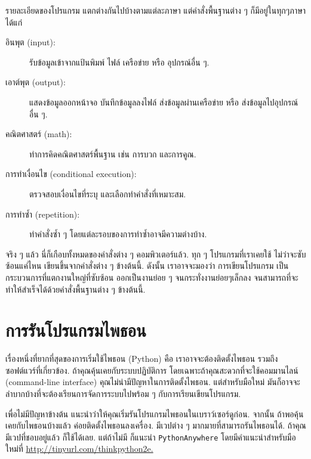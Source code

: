 รายละเอียดของโปรแกรม แตกต่างกันไปบ้างตามแต่ละภาษา แต่คำสั่งพื้นฐานต่าง ๆ ก็มีอยู่ในทุกๆภาษา ได้แก่

\begin{description}

\item[อินพุต (input):] รับข้อมูลเข้าจากแป้นพิมพ์ ไฟล์ เครือข่าย หรือ อุปกรณ์อื่น ๆ.

\item[เอาต์พุต (output):] แสดงข้อมูลออกหน้าจอ บันทึกข้อมูลลงไฟล์ ส่งข้อมูลผ่านเครือข่าย หรือ ส่งข้อมูลไปอุปกรณ์อื่น ๆ.
    
\item[คณิตศาสตร์ (math):] ทำการคิดคณิตศาสตร์พื้นฐาน เช่น การบวก และการคูณ.
    
\item[การทำเงื่อนไข (conditional execution):] ตรวจสอบเงื่อนไขที่ระบุ และเลือกทำคำสั่งที่เหมาะสม.
    
\item[การทำซ้ำ (repetition):] ทำคำสั่งซ้ำ ๆ โดยแต่ละรอบของการทำซ้ำอาจมีความต่างบ้าง.

\end{description}

จริง ๆ แล้ว นี่ก็เกือบทั้งหมดของคำสั่งต่าง ๆ คอมพิวเตอร์แล้ว.
ทุก ๆ โปรแกรมที่เราเคยใช้ ไม่ว่าจะซับซ้อนแค่ไหน เขียนขึ้นจากคำสั่งต่าง ๆ ข้างต้นนี้.
ดังนั้น เราอาจจะมองว่า การเขียนโปรแกรม เป็น กระบวนการที่แตกงานใหญ่ที่ซับซ้อน ออกเป็นงานย่อย ๆ จนกระทั่งงานย่อยๆเล็กลง จนสามารถที่จะทำให้สำเร็จได้ด้วยคำสั่งพื้นฐานต่าง ๆ ข้างต้นนี้.

\section{การรันโปรแกรมไพธอน}

เรื่องหนึ่งที่ยากที่สุดของการเริ่มใช้ไพธอน (Python) คือ เราอาจจะต้องติดตั้งไพธอน รวมถึงซอฟต์แวร์ที่เกี่ยวข้อง.
ถ้าคุณคุ้นเคยกับระบบปฏิบัติการ โดยเฉพาะถ้าคุณสะดวกที่จะใช้คอมมานไลน์ (command-line interface) คุณไม่น่ามีปัญหาในการติดตั้งไพธอน.
แต่สำหรับมือใหม่ มันก็อาจจะลำบากบ้างที่จะต้องเรียนการจัดการระบบไปพร้อม ๆ กับการเรียนเขียนโปรแกรม.

เพื่อไม่มีปัญหาข้างต้น แนะนำว่าให้คุณเริ่มรันโปรแกรมไพธอนในเบราว์เซอร์ดูก่อน.
จากนั้น ถ้าพอคุ้นเคยกับไพธอนบ้างแล้ว ค่อยติดตั้งไพธอนลงเครื่อง.
มีเวปต่าง ๆ มากมายที่สามารถรันไพธอนได้. ถ้าคุณมีเวปที่ชอบอยู่แล้ว ก็ใช้ได้เลย.
แต่ถ้าไม่มี ก็แนะนำ \texttt{PythonAnywhere} โดยมีคำแนะนำสำหรับมือใหม่ที่ \url{http://tinyurl.com/thinkpython2e.}

